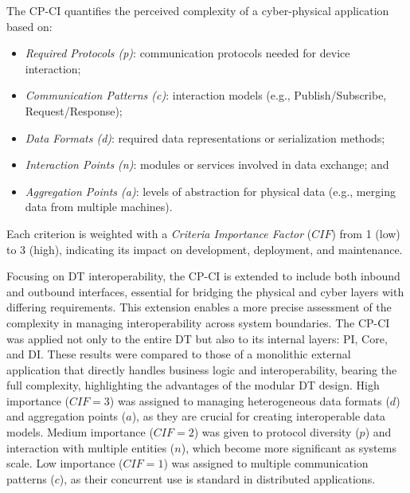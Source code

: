 The CP-CI quantifies the perceived complexity of a cyber-physical application based on:
\begin{itemize}
    \item \textit{Required Protocols (p)}: communication protocols needed for device interaction;
    \item \textit{Communication Patterns (c)}: interaction models (e.g., Publish/Subscribe, Request/Response);
    \item \textit{Data Formats (d)}: required data representations or serialization methods;
    \item \textit{Interaction Points (n)}: modules or services involved in data exchange; and
    \item \textit{Aggregation Points (a)}: levels of abstraction for physical data (e.g., merging data from multiple machines).
\end{itemize}
Each criterion is weighted with a \textit{Criteria Importance Factor} (\(CIF\)) from 1 (low) to 3 (high), indicating its impact on development, deployment, and maintenance.

Focusing on \ac{DT} interoperability, the CP-CI is extended to include both inbound and outbound interfaces, essential for bridging the physical and cyber layers with differing requirements.
This extension enables a more precise assessment of the complexity in managing interoperability across system boundaries.
The CP-CI was applied not only to the entire \ac{DT} but also to its internal layers: \ac{PI}, Core, and \ac{DI}.
These results were compared to those of a monolithic external application that directly handles business logic and interoperability, bearing the full complexity, highlighting the advantages of the modular \ac{DT} design.
High importance ($CIF=3$) was assigned to managing heterogeneous data formats ($d$) and aggregation points ($a$), as they are crucial for creating interoperable data models.
Medium importance ($CIF=2$) was given to protocol diversity ($p$) and interaction with multiple entities ($n$), which become more significant as systems scale.
Low importance ($CIF=1$) was assigned to multiple communication patterns ($c$), as their concurrent use is standard in distributed applications.


